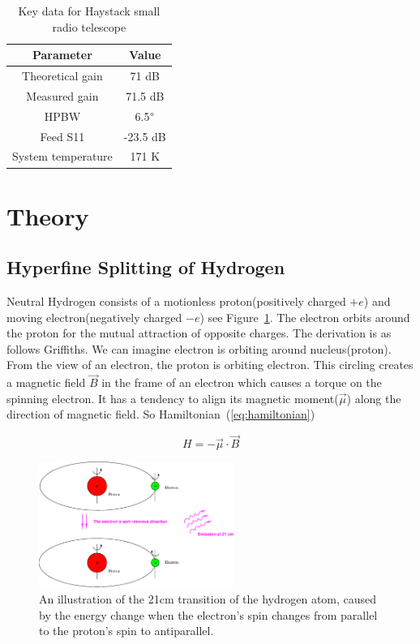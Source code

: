 \documentclass[10pt,conference]{IEEEtran}
\begin{document}
\begin{table}[htbp]
\caption{Key data for Haystack small radio telescope}
\begin{center}
\begin{tabular}{|c|c|}
\hline
\textbf{Parameter}&\multicolumn{1}{|c|}{\textbf{Value}} \\
\cline{1-2} 
\hline
Theoretical gain & 71 dB\\
\hline
Measured gain & 71.5 dB\\
\hline
HPBW & 6.5$\degree$\\
\hline
Feed S11 & -23.5 dB\\
\hline
System temperature & 171 K\\
\hline
\end{tabular}
\label{Tab:block_summerize}
\end{center}
\end{table}

\section{Theory}

\subsection{Hyperfine Splitting of Hydrogen}

Neutral Hydrogen consists of a motionless proton(positively charged $+e$) and moving electron(negatively charged $-e$) see Figure~\ref{fig:hyperfine_figure}. The electron orbits around the proton for the mutual attraction of opposite charges. The derivation is as follows Griffiths\cite{griffiths2016introduction}. We can imagine electron is orbiting around nucleus(proton). From the view of an electron, the proton is orbiting electron. This circling creates a magnetic field $\vec{B}$ in the frame of an electron which causes a torque on the spinning electron. It has a tendency to align its magnetic moment($\vec{\mu}$) along the direction of magnetic field\cite{griffiths2016introduction}. So Hamiltonian~(\ref{eq:hamiltonian})

\begin{equation}
  H=-\vec{\mu}\cdot\vec{B}
  \label{eq:hamiltonian} 
\end{equation}

\begin{figure}[htbp]
\centerline{\includegraphics[width=2.5in]{hyperfine.eps}}
\caption{An illustration of the 21cm transition of the hydrogen atom, caused by the energy change when the electron's spin changes from parallel to the proton's spin to antiparallel\cite{Dante2014}.}
\label{fig:hyperfine_figure}
\end{figure}
\end{document}
